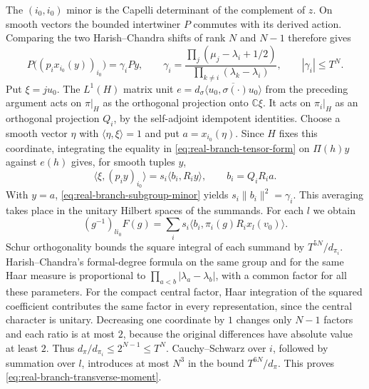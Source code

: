 The \((i_0,i_0)\) minor is the Capelli determinant of the complement
of \(z\). On smooth vectors the bounded intertwiner \(P\) commutes
with its derived action. Comparing the two Harish--Chandra shifts
of rank \(N\) and \(N-1\) therefore gives
\begin{equation}
 P\bigl((p_i x_{i_0}(y))_{i_0}\bigr)
   =\gamma_i P y,\qquad
 \gamma_i=\frac{\prod_j(\mu_j-\lambda_i+1/2)}
                  {\prod_{k\ne i}(\lambda_k-\lambda_i)},\qquad
 |\gamma_i|\le T^N .
 \label{eq:real-branch-subgroup-minor}
\end{equation}
Put \(\xi=j u_0\). The \(L^1(H)\) matrix unit
\(e=d_\sigma\overline{\langle u_0,\sigma(\cdot)u_0\rangle}\) from
the preceding argument acts on \(\pi|_H\) as the orthogonal
projection onto \(\mathbb C\xi\). It acts on \(\pi_i|_H\) as an
orthogonal projection \(Q_i\), by the self-adjoint idempotent
identities. Choose a smooth vector \(\eta\) with
\(\langle\eta,\xi\rangle=1\) and put \(a=x_{i_0}(\eta)\). Since
\(H\) fixes this coordinate, integrating the equality in
\eqref{eq:real-branch-tensor-form} on \(\Pi(h)y\) against \(e(h)\)
gives, for smooth tuples \(y\),
\[
 \langle\xi,(p_i y)_{i_0}\rangle
    =s_i\langle b_i,R_i y\rangle,\qquad b_i=Q_i R_i a .
\]
With \(y=a\), \eqref{eq:real-branch-subgroup-minor} yields
\(s_i\|b_i\|^2=\gamma_i\). This averaging takes place in the
unitary Hilbert spaces of the summands. For each \(l\) we obtain
\[
 (g^{-1})_{l i_0} F(g)
   =\sum_i s_i\langle b_i,\pi_i(g) R_i x_l(v_0)\rangle .
\]
Schur orthogonality bounds the square integral of each summand by
\(T^{5N}/d_{\pi_i}\). Harish--Chandra's formal-degree formula on
the same group and for the same Haar measure is proportional to
\(\prod_{a<b}|\lambda_a-\lambda_b|\), with a common factor for all
these parameters. For the compact central factor, Haar integration
of the squared coefficient contributes the same factor in every
representation, since the central character is unitary. Decreasing
one coordinate by \(1\) changes only
\(N-1\) factors and each ratio is at most \(2\), because the original
differences have absolute value at least \(2\). Thus
\(d_\pi/d_{\pi_i}\le 2^{N-1}\le T^N\).
\cite[(3.10), (3.12) and Theorem~(8.1)]{ar4-atiyah-schmid}
Cauchy--Schwarz over \(i\), followed by summation over \(l\),
introduces at most \(N^3\) in the bound \(T^{6N}/d_\pi\).
This proves \eqref{eq:real-branch-transverse-moment}.

